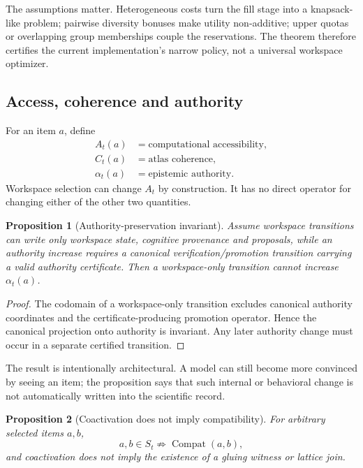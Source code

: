 \documentclass[11pt]{article}
\newcommand{\Compat}{\operatorname{Compat}}
\newtheorem{proposition}{Proposition}
\begin{document}
The assumptions matter. Heterogeneous costs turn the fill stage into a knapsack-like problem; pairwise diversity bonuses make utility non-additive; upper quotas or overlapping group memberships couple the reservations. The theorem therefore certifies the current implementation's narrow policy, not a universal workspace optimizer.

\subsection{Access, coherence and authority}

For an item \(a\), define
\[
\begin{aligned}
A_t(a)&=\text{computational accessibility},\\
C_t(a)&=\text{atlas coherence},\\
\alpha_t(a)&=\text{epistemic authority}.
\end{aligned}
\]
Workspace selection can change \(A_t\) by construction. It has no direct operator for changing either of the other two quantities.

\begin{proposition}[Authority-preservation invariant]
Assume workspace transitions can write only workspace state, cognitive provenance and proposals, while an authority increase requires a canonical verification/promotion transition carrying a valid authority certificate. Then a workspace-only transition cannot increase \(\alpha_t(a)\).
\end{proposition}

\begin{proof}
The codomain of a workspace-only transition excludes canonical authority coordinates and the certificate-producing promotion operator. Hence the canonical projection onto authority is invariant. Any later authority change must occur in a separate certified transition.
\end{proof}

The result is intentionally architectural. A model can still become more convinced by seeing an item; the proposition says that such internal or behavioral change is not automatically written into the scientific record.

\begin{proposition}[Coactivation does not imply compatibility]
For arbitrary selected items \(a,b\),
\[
a,b\in S_t\not\Rightarrow \Compat(a,b),
\]
and coactivation does not imply the existence of a gluing witness or lattice join.
\end{proposition}
\end{document}
